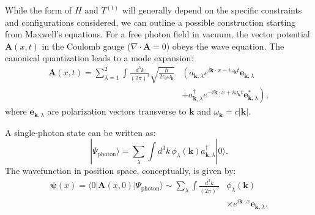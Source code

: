 \documentclass[aps,prl,twocolumn,showpacs,showkeys,superscriptaddress,amsmath,amssymb]{revtex4-2}
\begin{document}

While the form of $H$ and $T^{(t)}$ will generally depend on the specific constraints and configurations considered, we can outline a possible construction starting from Maxwell’s equations. For a free photon field in vacuum, the vector potential $\mathbf{A}(x,t)$ in the Coulomb gauge ($\nabla \cdot \mathbf{A}=0$) obeys the wave equation. The canonical quantization leads to a mode expansion:
\begin{equation}
\begin{split}
\mathbf{A}(x,t) = \sum_{\lambda=1}^{2}\int \frac{d^3k}{(2\pi)^3}\sqrt{\frac{\hbar}{2\epsilon_0 \omega_{\mathbf{k}}}} & \left(a_{\mathbf{k},\lambda} e^{i\mathbf{k}\cdot x - i\omega_{\mathbf{k}} t}\mathbf{e}_{\mathbf{k},\lambda} \right. \\
& \left. + a_{\mathbf{k},\lambda}^\dagger e^{-i\mathbf{k}\cdot x + i\omega_{\mathbf{k}} t}\mathbf{e}_{\mathbf{k},\lambda}^*\right),
\end{split}
\end{equation}
where $\mathbf{e}_{\mathbf{k},\lambda}$ are polarization vectors transverse to $\mathbf{k}$ and $\omega_{\mathbf{k}}=c|\mathbf{k}|$.

A single-photon state can be written as:
\begin{equation}
| \Psi_{\text{photon}} \rangle = \sum_{\lambda}\int d^3k\, \phi_{\lambda}(\mathbf{k}) a_{\mathbf{k},\lambda}^\dagger |0\rangle.
\end{equation}
The wavefunction in position space, conceptually, is given by:
\begin{equation}
\begin{split}
\bm{\psi}(x) = \langle 0|\mathbf{A}(x,0)|\Psi_{\text{photon}}\rangle \sim 
    \sum_{\lambda}\int \frac{d^3k}{(2\pi)^3} & \phi_{\lambda}(\mathbf{k}) \\
    & \times e^{i\mathbf{k}\cdot x}\mathbf{e}_{\mathbf{k},\lambda}.
\end{split}
\end{equation}
\end{document}
